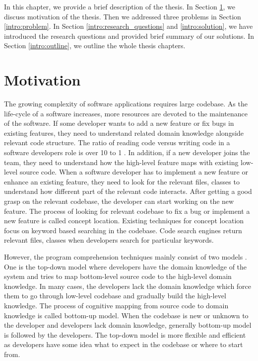In this chapter, we provide a brief description of the thesis. In Section \ref{intro:motivation}, we discuss motivation of the thesis. Then we addressed three problems in Section \ref{intro:problem}. In Section \ref{intro:research_questions} and \ref{intro:solution}, we have introduced the research questions and provided brief summary of our solutions. In Section \ref{intro:outline}, we outline the whole thesis chapters. 


\section{Motivation}
\label{intro:motivation}
 The growing complexity of software applications requires large codebase. As the life-cycle of a software increases, more resources are devoted to the maintenance of the software. If some developer wants to add a new feature or fix bugs in existing features, they need to understand related domain knowledge alongside relevant code structure. The ratio of reading code versus writing code in a software developers role is over 10 to 1 \cite{martin2008clean}. In addition, if a new developer joins the team, they need to understand how the high-level feature maps with existing low-level source code. When a software developer has to implement a new feature or enhance an existing feature, they need to look for the relevant files, classes to understand how different part of the relevant code interacts. After getting a good grasp on the relevant codebase, the developer can start working on the new feature. The process of looking for relevant codebase to fix a bug or implement a new feature is called concept location. Existing techniques for concept location focus on keyword based searching in the codebase. Code search engines return relevant files, classes when developers search for particular keywords. 
 
 However, the program comprehension techniques mainly consist of two models \cite{tilley1998reverseEngineeringFramework, von1993programToolRequirements, siegmund2016programPastFuture}. One is the top-down model where developers have the domain knowledge of the system and tries to map bottom-level source code to the high-level domain knowledge. In many cases, the developers lack the domain knowledge which force them to go through low-level codebase and gradually build the high-level knowledge. The process of cognitive mapping from source code to domain knowledge is called bottom-up model. When the codebase is new or unknown to the developer and developers lack domain knowledge, generally bottom-up model is followed by the developers. The top-down model is more flexible and efficient as developers have some idea what to expect in the codebase or where to start from. 
 
